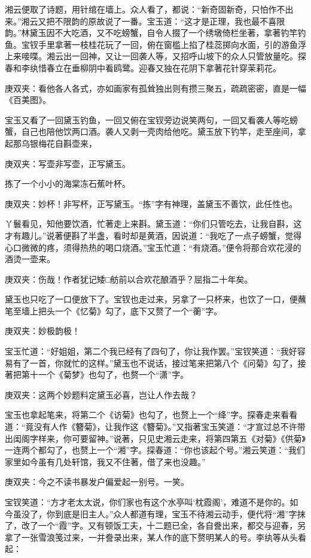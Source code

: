 \begin{parag}
    湘云便取了诗题，用针绾在墙上。众人看了，都说：“新奇固新奇，只怕作不出来。”湘云又把不限韵的原故说了一番。宝玉道：“这才是正理，我也最不喜限韵。”林黛玉因不大吃酒，又不吃螃蟹，自令人掇了一个绣墩倚栏坐著，拿著钓竿钓鱼。宝钗手里拿著一枝桂花玩了一回，俯在窗槛上掐了桂蕊掷向水面，引的游鱼浮上来唼喋。湘云出一回神，又让一回袭人等，又招呼山坡下的众人只管放量吃。探春和李纨惜春立在垂柳阴中看鸥鹭。迎春又独在花阴下拿著花针穿茉莉花。\begin{note}庚双夹：看他各人各式，亦如画家有孤耸独出则有攒三聚五，疏疏密密，直是一幅《百美图》。\end{note}宝玉又看了一回黛玉钓鱼，一回又俯在宝钗旁边说笑两句，一回又看袭人等吃螃蟹，自己也陪他饮两口酒。袭人又剥一壳肉给他吃。黛玉放下钓竿，走至座间，拿起那乌银梅花自斟壶来，\begin{note}庚双夹：写壶非写壶，正写黛玉。\end{note}拣了一个小小的海棠冻石蕉叶杯。\begin{note}庚双夹：妙杯！非写杯，正写黛玉。“拣”字有神理，盖黛玉不善饮，此任性也。\end{note}丫鬟看见，知他要饮酒，忙著走上来斟。黛玉道：“你们只管吃去，让我自斟，这才有趣儿。”说著便斟了半盏，看时却是黄酒，因说道：“我吃了一点子螃蟹，觉得心口微微的疼，须得热热的喝口烧酒。”宝玉忙道：“有烧酒。”便令将那合欢花浸的酒烫一壶来。\begin{note}庚双夹：伤哉！作者犹记矮□舫前以合欢花酿酒乎？屈指二十年矣。\end{note}黛玉也只吃了一口便放下了。宝钗也走过来，另拿了一只杯来，也饮了一口，便蘸笔至墙上把头一个《忆菊》勾了，底下又赘了一个“蘅”字。\begin{note}庚双夹：妙极韵极！\end{note}宝玉忙道：“好姐姐，第二个我已经有了四句了，你让我作罢。”宝钗笑道：“我好容易有了一首，你就忙的这样。”黛玉也不说话，接过笔来把第八个《问菊》勾了，接著把第十一个《菊梦》也勾了，也赘一个“潇”字。\begin{note}庚双夹：这两个妙题料定黛玉必喜，岂让人作去哉？\end{note}宝玉也拿起笔来，将第二个《访菊》也勾了，也赘上一个“绛”字。探春走来看看道：“竟没有人作《簪菊》，让我作这《簪菊》。”又指著宝玉笑道：“才宣过总不许带出闺阁字样来，你可要留神。”说著，只见史湘云走来，将第四第五《对菊》《供菊》一连两个都勾了，也赘上一个“湘”字。探春道：“你也该起个号。”湘云笑道：“我们家里如今虽有几处轩馆，我又不住著，借了来也没趣。”\begin{note}庚双夹：今之不读书暴发户偏爱起一别号。一笑。\end{note}宝钗笑道：“方才老太太说，你们家也有这个水亭叫‘枕霞阁’，难道不是你的。如今虽没了，你到底是旧主人。”众人都道有理，宝玉不待湘云动手，便代将“湘”字抹了，改了一个“霞”字。又有顿饭工夫，十二题已全，各自誊出来，都交与迎春，另拿了一张雪浪笺过来，一并誊录出来，某人作的底下赘明某人的号。李纨等从头看起：
\end{parag}


